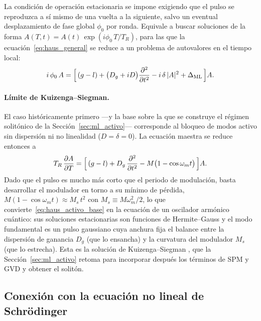 La condición de operación estacionaria se impone exigiendo que el pulso se
reproduzca a sí mismo de una vuelta a la siguiente, salvo un eventual
desplazamiento de fase global $\phi_0$ por ronda. Equivale a buscar soluciones de
la forma $A(T,t)=A(t)\,\exp(i\phi_0\,T/T_R)$, para las que la
ecuación~\eqref{eq:haus_general} se reduce a un problema de autovalores en el
tiempo local:
%
\begin{equation}
    i\,\phi_0\,A
    = \Bigl[\,(g-l)
      + \bigl(D_g + iD\bigr)\frac{\partial^2}{\partial t^2}
      - i\,\delta\,|A|^2
      + \Delta_{\mathrm{ML}} \,\Bigr] A .
    \label{eq:haus_estacionario}
\end{equation}
 
\paragraph{Límite de Kuizenga--Siegman.}
El caso históricamente primero —y la base sobre la que se construye el régimen
solitónico de la Sección~\ref{sec:ml_activo}— corresponde al bloqueo de modos
activo sin dispersión ni no linealidad ($D=\delta=0$). La ecuación maestra se
reduce entonces a
%
\begin{equation}
    T_R\,\frac{\partial A}{\partial T}
    = \Bigl[\,(g-l)
      + D_g\,\frac{\partial^2}{\partial t^2}
      - M\bigl(1-\cos\omega_m t\bigr) \,\Bigr] A .
    \label{eq:haus_activo_base}
\end{equation}
%
Dado que el pulso es mucho más corto que el periodo de modulación, basta
desarrollar el modulador en torno a su mínimo de pérdida,
$M(1-\cos\omega_m t)\approx M_s\,t^2$ con $M_s\equiv M\omega_m^2/2$, lo que
convierte~\eqref{eq:haus_activo_base} en la ecuación de un oscilador armónico
cuántico: sus soluciones estacionarias son funciones de Hermite--Gauss y el modo
fundamental es un pulso gaussiano cuya anchura fija el balance entre la dispersión
de ganancia $D_g$ (que lo ensancha) y la curvatura del modulador $M_s$ (que lo
estrecha). Esta es la solución de Kuizenga--Siegman \cite{KuizengaSiegman1970},
que la Sección~\ref{sec:ml_activo} retoma para incorporar después los términos de
SPM y GVD y obtener el solitón.
 
\subsection{Conexión con la ecuación no lineal de Schrödinger}
 
